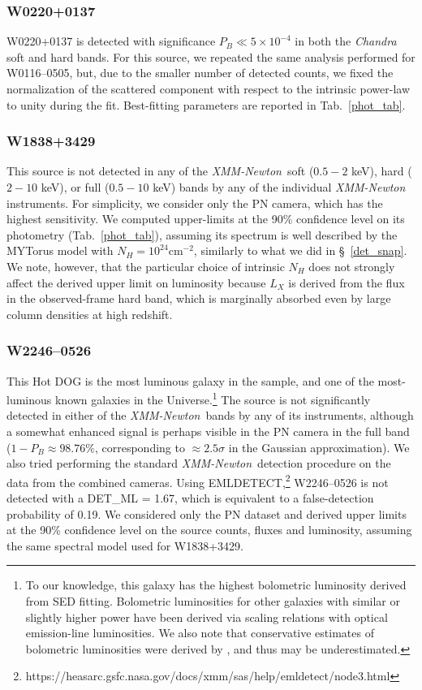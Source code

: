 \documentclass[useAMS,usenatbib]{mnras}
\newcommand*{\xmm}{\textit{\mbox{XMM-Newton}}}
\newcommand*{\chandra}{\textit{Chandra}}
\newcommand*{\nhunits}{\mathrm{cm^{-2}}}
\begin{document}
\subsubsection{W0220+0137}
W0220+0137 is detected with significance \mbox{$P_B\ll5\times10^{-4}$} in both the \chandra\, soft and hard bands.
For this source, we repeated the same analysis performed for W0116--0505, but, due to the smaller number of detected counts, we fixed the normalization of the scattered component with respect to the intrinsic power-law to unity during the fit. Best-fitting parameters are reported in Tab.~\ref{phot_tab}.


\subsubsection{W1838+3429}
This source is not detected in any of the \xmm\, soft ($0.5-2$ keV), hard ($2-10$ keV), or full ($0.5-10$ keV) bands by any of the individual \xmm\, instruments.
For simplicity, we consider only the PN camera, which has the highest sensitivity.
We computed upper-limits at the 90\% confidence level on its photometry (Tab.~\ref{phot_tab}), assuming its spectrum is well described by the MYTorus model with $N_H=10^{24}\nhunits$, similarly to what we did in \S~\ref{det_snap}. We note, however, that the particular choice of intrinsic $N_H$ does not strongly affect the derived upper limit on luminosity because $L_X$ is derived from the flux in the observed-frame hard band, which is marginally absorbed even by large column densities at high redshift.


\subsubsection{W2246--0526}
This Hot DOG is the most luminous galaxy in the sample, and one of the most-luminous known galaxies in the Universe.\footnote{To our knowledge, this galaxy has the highest bolometric luminosity derived from SED fitting. Bolometric luminosities for other galaxies with similar or slightly higher power have been derived via scaling relations with optical emission-line luminosities. We also note that conservative estimates of bolometric luminosities were derived by \citet[see their section 3.3]{Tsai15}, and thus may be underestimated.} The source is not significantly detected in either of the \xmm\, bands by any of its instruments, although a somewhat enhanced signal is perhaps visible in the PN camera in the full band ($1-P_B\approx98.76\%$, corresponding to $\approx2.5\sigma$ in the Gaussian approximation). 
We also tried performing the standard \xmm\, detection procedure on the data from the combined cameras. Using EMLDETECT,\footnote{https://heasarc.gsfc.nasa.gov/docs/xmm/sas/help/emldetect/node3.html} W2246--0526 is not detected with a DET\_ML = 1.67, which is equivalent to a false-detection probability of 0.19.
We considered only the PN dataset and derived upper limits at the 90\% confidence level on the source counts, fluxes and luminosity, assuming the same spectral model used for W1838+3429.
\end{document}
